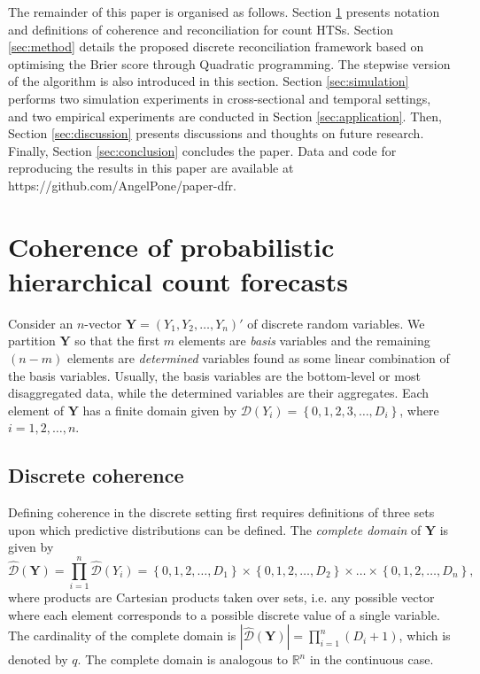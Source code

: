 \documentclass[a4paper,review,11pt,authoryear]{elsarticle}
\newcommand{\bY}{\mathbf{Y}}
\theoremstyle{definition}
\begin{document}
The remainder of this paper is organised as follows.
Section \ref{sec:coherence} presents notation and definitions of coherence and reconciliation for count HTSs.
Section \ref{sec:method} details the proposed discrete reconciliation framework based on optimising the Brier score through Quadratic programming. The stepwise version of the algorithm is also introduced in this section.
Section \ref{sec:simulation} performs two simulation experiments in cross-sectional and temporal settings, and two empirical experiments are conducted in Section \ref{sec:application}.
Then, Section \ref{sec:discussion} presents discussions and thoughts on future research. 
Finally, Section \ref{sec:conclusion} concludes the paper.
Data and code for reproducing the results in this paper are available at https://github.com/AngelPone/paper-dfr.



\section{Coherence of probabilistic hierarchical count forecasts}

\label{sec:coherence}


Consider an $n$-vector $\bY=\left(Y_1,Y_2,\ldots,Y_n\right)'$ of discrete random variables.
We partition $\bY$ so that the first $m$ elements are \textit{basis} variables and the remaining $(n-m)$ elements are \textit{determined} variables found as some linear combination of the basis variables. Usually, the basis variables are the bottom-level or most disaggregated data, while the determined variables are their aggregates.
Each element of $\bY$ has a finite domain given by $\mathcal{D}(Y_i)=\left\{0, 1,2,3,\dots,D_i\right\}$, where $i = 1, 2, \dots, n$.

\subsection{Discrete coherence}\label{sec:domains}

Defining coherence in the discrete setting first requires definitions of three sets upon which predictive distributions can be defined. The \textit{complete domain} of $\bY$ is given by
\[
\hat{\mathcal D}(\bY)=\prod\limits_{i=1}^n\hat{\mathcal D}(Y_i)=\left\{0, 1,2,\dots,D_1\right\}\times\left\{0,1,2,\dots,D_2\right\}\times\dots\times\left\{0,1,2,\dots,D_n\right\},
\]
where products are Cartesian products taken over sets, i.e. any possible vector where each element corresponds to a possible discrete value of a single variable.
The cardinality of the complete domain is $|\hat{\mathcal D}(\bY)|=\prod\limits_{i=1}^{n} (D_i+1)$, which is denoted by $q$.
The complete domain is analogous to $\mathbb{R}^n$ in the continuous case.
\end{document}
